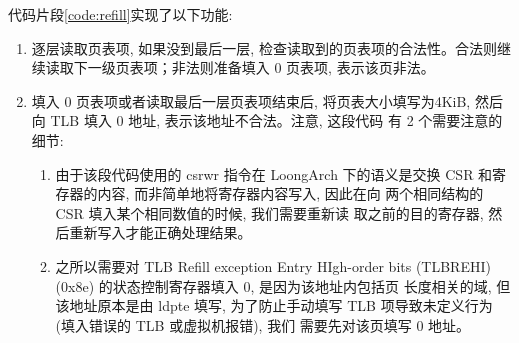 代码片段\autoref{code:refill}实现了以下功能:
\begin{enumerate}
    \item 逐层读取页表项, 如果没到最后一层, 检查读取到的页表项的合法性。合法则继续读取下一级页表项；非法则准备填入 0 页表项, 表示该页非法。
    \item 填入 0 页表项或者读取最后一层页表项结束后, 将页表大小填写为4KiB, 然后向 TLB 填入 0 地址, 表示该地址不合法。注意, 这段代码
    有 2 个需要注意的细节:
    \begin{enumerate}[label=$(\mathbf{\arabic*})$]
        \item 由于该段代码使用的 csrwr 指令在 LoongArch 下的语义是交换
        CSR 和寄存器的内容, 而非简单地将寄存器内容写入, 因此在向
        两个相同结构的 CSR 填入某个相同数值的时候, 我们需要重新读
        取之前的目的寄存器, 然后重新写入才能正确处理结果。
        \item 之所以需要对 TLB Refill exception Entry HIgh-order bits (TLBREHI)(0x8e) 的状态控制寄存器填入 0, 是因为该地址内包括页
        长度相关的域, 但该地址原本是由 ldpte 填写, 为了防止手动填写
        TLB 项导致未定义行为 (填入错误的 TLB 或虚拟机报错), 我们
        需要先对该页填写 0 地址。
    \end{enumerate}
\end{enumerate}